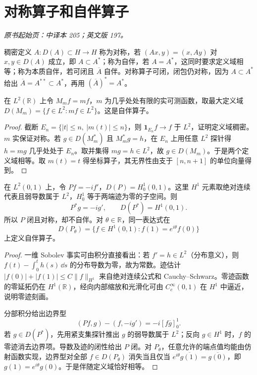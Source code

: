 \section{对称算子和自伴算子}\label{sec:yosida-07-03}
\noindent\textit{原书起始页：中译本 205；英文版 197。}

\begin{definition}[三个不同的概念]
稠密定义 $A:D(A)\subset H\to H$ 称为对称，若 $(Ax,y)=(x,Ay)$ 对 $x,y\in D(A)$ 成立，即 $A\subset A^*$；称为自伴，若 $A=A^*$，这同时要求定义域相等；称为本质自伴，若可闭且 $\overline A$ 自伴。对称算子可闭，闭包仍对称，因为 $A\subset A^*$ 给出 $\overline A=A^{**}\subset A^*$，再用 $(\overline A)^*=A^*$。
\end{definition}

\begin{example}[实乘法算子]
在 $L^2(\mathbb R)$ 上令 $M_mf=mf$，$m$ 为几乎处处有限的实可测函数，取最大定义域 $D(M_m)=\{f\in L^2:mf\in L^2\}$。这是自伴算子。
\end{example}
\begin{proof}
截断 $E_n=\{|t|\le n,\ |m(t)|\le n\}$，则 $\mathbf1_{E_n}f\to f$ 于 $L^2$，证明定义域稠密。$m$ 实保证对称。若 $g\in D(M_m^*)$ 且 $M_m^*g=h$，在 $E_n$ 上用任意 $L^2$ 探针得 $h=mg$ 几乎处处于 $E_n$。取并集得 $mg=h\in L^2$，故 $g\in D(M_m)$。于是两个定义域相等。取 $m(t)=t$ 得坐标算子，其无界性由支于 $[n,n+1]$ 的单位向量得到。
\end{proof}

\begin{example}\label{exm:y7-boundary}
在 $L^2(0,1)$ 上，令 $Pf=-if'$，$D(P)=H_0^1(0,1)$。这里 $H^1$ 元素取绝对连续代表且弱导数属于 $L^2$，$H_0^1$ 等于两端迹为零的子空间。则
\[
 P^*g=-ig',\qquad D(P^*)=H^1(0,1).
\]
所以 $P$ 闭且对称，却不自伴。对 $\theta\in\mathbb R$，同一表达式在
\[
 D(P_\theta)=\{f\in H^1(0,1):f(1)=e^{i\theta}f(0)\}
\]
上定义自伴算子。
\end{example}
\begin{proof}
一维 Sobolev 事实可由积分直接看出：若 $f'=h\in L^2$（分布意义），则 $f(t)-\int_0^th(s)\,\dd s$ 的分布导数为零，故为常数。迹估计 $|f(0)|+|f(1)|\le C\|f\|_{H^1}$ 来自绝对连续公式和 Cauchy--Schwarz。零迹函数的零延拓仍在 $H^1(\mathbb R)$，经向内部缩放和光滑化可由 $C_c^\infty(0,1)$ 在 $H^1$ 中逼近，说明零迹刻画。

分部积分给出边界型
\[
 (Pf,g)-(f,-ig')=-i[f\overline g]_0^1.
\]
若 $g\in D(P^*)$，先用紧支集探针推出 $g$ 的弱导数属于 $L^2$；反向 $g\in H^1$ 时，$f$ 的零迹消去边界项。导数及迹的闭性给出 $P$ 闭。对 $P_\theta$，任意允许的端点值均能由仿射函数实现，边界型对全部 $f\in D(P_\theta)$ 消失当且仅当 $e^{i\theta}\overline{g(1)}=\overline{g(0)}$，即 $g(1)=e^{i\theta}g(0)$。于是伴随定义域恰好相等。
\end{proof}


